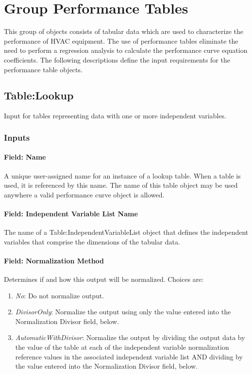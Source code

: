 \section{Group Performance Tables}\label{group-performance-tables}

This group of objects consists of tabular data which are used to characterize the performance of HVAC equipment. The use of performance tables eliminate the need to perform a regression analysis to calculate the performance curve equation coefficients. The following descriptions define the input requirements for the performance table objects.

\subsection{Table:Lookup}\label{tablelookup}

Input for tables representing data with one or more independent
variables.

\subsubsection{Inputs}

\paragraph{Field: Name}\label{field-name}

A unique user-assigned name for an instance of a lookup table. When a
table is used, it is referenced by this name. The name of this table
object may be used anywhere a valid performance curve object is allowed.

\paragraph{Field: Independent Variable List
Name}\label{field-independent-variable-list-name}

The name of a Table:IndependentVariableList object that defines the
independent variables that comprise the dimensions of the tabular data.

\paragraph{Field: Normalization Method}\label{field-normalization-method}

Determines if and how this output will be normalized. Choices are:

\begin{enumerate}
  \item \emph{No}: Do not normalize output.
  \item \emph{DivisorOnly}: Normalize the output using only the value entered into the Normalization Divisor field, below.
  \item \emph{AutomaticWithDivisor}: Normalize the output by dividing the output data by the value of the table at each of the independent variable normalization reference values in the associated independent variable list AND dividing by the value entered into the Normalization Divisor field, below.
\end{enumerate}

